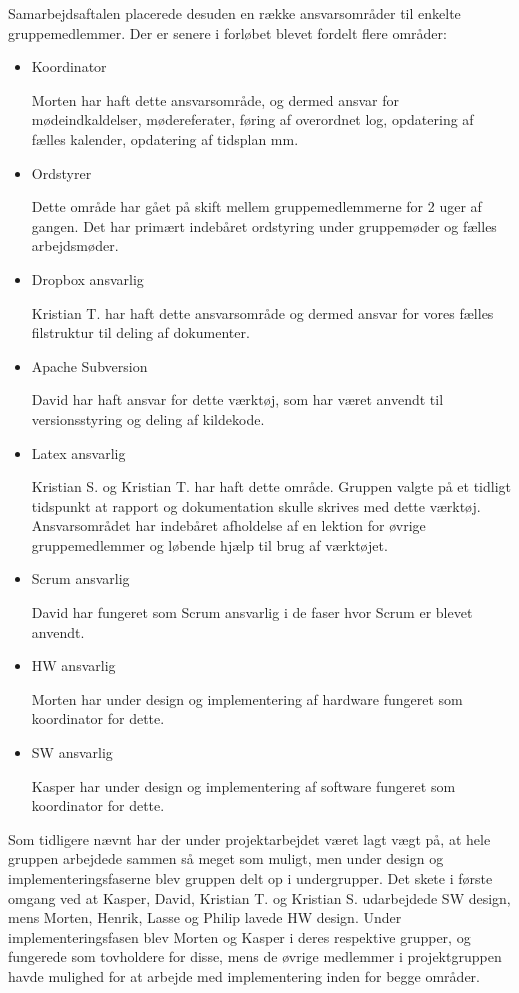 Samarbejdsaftalen placerede desuden en række ansvarsområder til enkelte gruppemedlemmer. 
Der er senere i forløbet blevet fordelt flere områder:
\begin{itemize}
\item Koordinator

Morten har haft dette ansvarsområde, og dermed ansvar for mødeindkaldelser, mødereferater, føring af overordnet log, opdatering af fælles kalender, opdatering af tidsplan mm. 

\item Ordstyrer

Dette område har gået på skift mellem gruppemedlemmerne for 2 uger af gangen. 
Det har primært indebåret ordstyring under gruppemøder og fælles arbejdsmøder.

\item Dropbox ansvarlig

Kristian T. har haft dette ansvarsområde og dermed ansvar for vores fælles filstruktur til deling af dokumenter.

\item Apache Subversion

David har haft ansvar for dette værktøj, som har været anvendt til versionsstyring og deling af kildekode. 

\item Latex ansvarlig

Kristian S. og Kristian T. har haft dette område. 
Gruppen valgte på et tidligt tidspunkt at rapport og dokumentation skulle skrives med dette værktøj. 
Ansvarsområdet har indebåret afholdelse af en lektion for øvrige gruppemedlemmer og løbende hjælp til brug af værktøjet. 

\item Scrum ansvarlig

David har fungeret som Scrum ansvarlig i de faser hvor Scrum er blevet anvendt. 

\item HW ansvarlig

Morten har under design og implementering af hardware fungeret som koordinator for dette.

\item SW ansvarlig

Kasper har under design og implementering af software fungeret som koordinator for dette. 
\end{itemize}


Som tidligere nævnt har der under projektarbejdet været lagt vægt på, at hele gruppen arbejdede sammen så meget som muligt, men under design og implementeringsfaserne blev gruppen delt op i undergrupper. 
Det skete i første omgang ved at Kasper, David, Kristian T. og Kristian S. udarbejdede SW design, mens Morten, Henrik, Lasse og Philip lavede HW design. 
Under implementeringsfasen blev Morten og Kasper i deres respektive grupper, og fungerede som tovholdere for disse, mens de øvrige medlemmer i projektgruppen havde mulighed for at arbejde med implementering inden for begge områder. 


